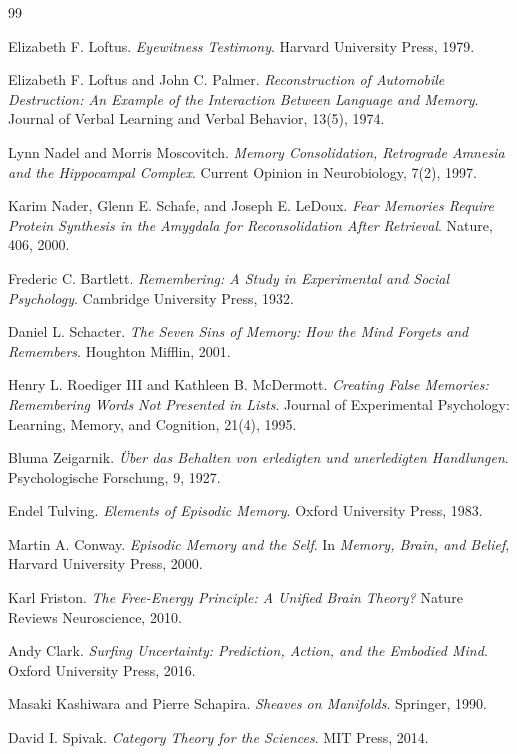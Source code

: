 \documentclass[12pt, letterpaper]{article}
\theoremstyle{flyxion}
\begin{document}
\begin{thebibliography}{99}

Elizabeth F. Loftus.
\textit{Eyewitness Testimony}.
Harvard University Press, 1979.

Elizabeth F. Loftus and John C. Palmer.
\textit{Reconstruction of Automobile Destruction: An Example of the Interaction Between Language and Memory}.
Journal of Verbal Learning and Verbal Behavior, 13(5), 1974.

Lynn Nadel and Morris Moscovitch.
\textit{Memory Consolidation, Retrograde Amnesia and the Hippocampal Complex}.
Current Opinion in Neurobiology, 7(2), 1997.

Karim Nader, Glenn E. Schafe, and Joseph E. LeDoux.
\textit{Fear Memories Require Protein Synthesis in the Amygdala for Reconsolidation After Retrieval}.
Nature, 406, 2000.

Frederic C. Bartlett.
\textit{Remembering: A Study in Experimental and Social Psychology}.
Cambridge University Press, 1932.

Daniel L. Schacter.
\textit{The Seven Sins of Memory: How the Mind Forgets and Remembers}.
Houghton Mifflin, 2001.

Henry L. Roediger III and Kathleen B. McDermott.
\textit{Creating False Memories: Remembering Words Not Presented in Lists}.
Journal of Experimental Psychology: Learning, Memory, and Cognition, 21(4), 1995.

Bluma Zeigarnik.
\textit{Über das Behalten von erledigten und unerledigten Handlungen}.
Psychologische Forschung, 9, 1927.

Endel Tulving.
\textit{Elements of Episodic Memory}.
Oxford University Press, 1983.

Martin A. Conway.
\textit{Episodic Memory and the Self}.
In \textit{Memory, Brain, and Belief}, Harvard University Press, 2000.

Karl Friston.
\textit{The Free-Energy Principle: A Unified Brain Theory?}
Nature Reviews Neuroscience, 2010.

Andy Clark.
\textit{Surfing Uncertainty: Prediction, Action, and the Embodied Mind}.
Oxford University Press, 2016.

Masaki Kashiwara and Pierre Schapira.
\textit{Sheaves on Manifolds}.
Springer, 1990.

David I. Spivak.
\textit{Category Theory for the Sciences}.
MIT Press, 2014.


\end{thebibliography}
\end{document}

